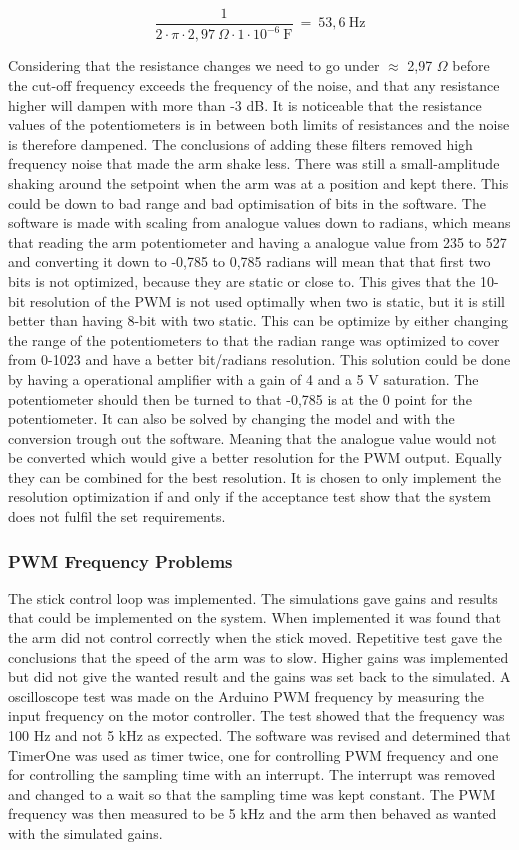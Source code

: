 \begin{equation}
\frac{1}{2\cdot \pi \cdot 2,97\ \Omega \cdot 1 \cdot 10^{-6}\  \text{F}}\ =\ 53,6\ \text{Hz}
\end{equation}

Considering that the resistance changes we need to go under $\approx$ 2,97 $\Omega$ before the cut-off frequency exceeds the frequency of the noise, and that any resistance higher will dampen with more than -3 dB. It is noticeable that the resistance values of the potentiometers is in between both limits of resistances and the noise is therefore dampened. The conclusions of adding these filters removed high frequency noise that made the arm shake less. There was still a small-amplitude shaking around the setpoint when the arm was at a position and kept there. This could be down to bad range and bad optimisation of bits in the software. The software is made with scaling from analogue values down to radians, which means that reading the arm potentiometer and having a analogue value from 235 to 527 and converting it down to -0,785 to 0,785 radians will mean that that first two bits is not optimized, because they are static or close to. This gives that the 10-bit resolution of the PWM is not used optimally when two is static, but it is still better than having 8-bit with two static. This can be optimize by either changing the range of the potentiometers to that the radian range was optimized to cover from 0-1023 and have a better bit/radians resolution. This solution could be done by having a operational amplifier with a gain of 4 and a 5 V saturation. The potentiometer should then be turned to that -0,785 is at the 0 point for the potentiometer. It can also be solved by changing the model and with the conversion trough out the software. Meaning that the analogue value would not be converted which would give a better resolution for the PWM output. Equally they can be combined for the best resolution. It is chosen to only implement the resolution optimization if and only if the acceptance test show that the system does not fulfil the set requirements.

\subsubsection{PWM Frequency Problems}
The stick control loop was implemented. The simulations gave gains and results that could be implemented on the system. When implemented it was found that the arm did not control correctly when the stick moved. Repetitive test gave the conclusions that the speed of the arm was to slow. Higher gains was implemented but did not give the wanted result and the gains was set back to the simulated. A oscilloscope test was made on the Arduino PWM frequency by measuring the input frequency on the motor controller. The test showed that the frequency was 100 Hz and not 5 kHz as expected. The software was revised and determined that TimerOne was used as timer twice, one for controlling PWM frequency and one for controlling the sampling time with an interrupt. The interrupt was removed and changed to a wait so that the sampling time was kept constant. The PWM frequency was then measured to be 5 kHz and the arm then behaved as wanted with the simulated gains.    

